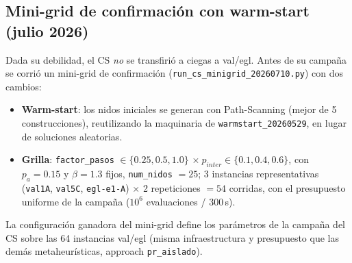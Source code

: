 \subsection{Mini-grid de confirmación con warm-start (julio 2026)}
Dada su debilidad, el CS \emph{no} se transfirió a ciegas a val/egl. Antes de
su campaña se corrió un mini-grid de confirmación
(\texttt{run\_cs\_minigrid\_20260710.py}) con dos cambios:

\begin{itemize}
  \item \textbf{Warm-start}: los nidos iniciales se generan con Path-Scanning
    (mejor de 5 construcciones), reutilizando la maquinaria de
    \texttt{warmstart\_20260529}, en lugar de soluciones aleatorias.
  \item \textbf{Grilla}: \texttt{factor\_pasos} $\in \{0.25, 0.5, 1.0\}$
    $\times\ p_{inter} \in \{0.1, 0.4, 0.6\}$, con $p_a = 0.15$ y
    $\beta = 1.3$ fijos, \texttt{num\_nidos} $= 25$; 3 instancias
    representativas (\texttt{val1A}, \texttt{val5C}, \texttt{egl-e1-A})
    $\times$ 2 repeticiones $= 54$ corridas, con el presupuesto uniforme de la
    campaña ($10^6$ evaluaciones / 300\,s).
\end{itemize}

La configuración ganadora del mini-grid define los parámetros de la campaña
del CS sobre las 64 instancias val/egl (misma infraestructura y presupuesto
que las demás metaheurísticas, approach \texttt{pr\_aislado}).
